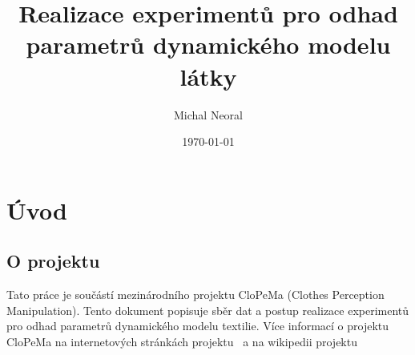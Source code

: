 \documentclass[10pt,a4paper,titlepage,oneside]{report}
\begin{document}
\title{Realizace experimentů pro odhad parametrů dynamického modelu látky}
\author{Michal Neoral}
\date{\today{}}
\maketitle



\chapter{Úvod}
\label{chap:intro}



\section{O projektu}
\label{sec:about}
Tato práce je součástí mezinárodního projektu CloPeMa (Clothes Perception Manipulation). Tento dokument popisuje sběr dat a postup realizace experimentů pro odhad parametrů dynamického modelu textilie. Více informací o projektu CloPeMa na internetových stránkách projektu~\cite{projekt} a na wikipedii projektu~\cite{wiki} 
\\
\end{document}
